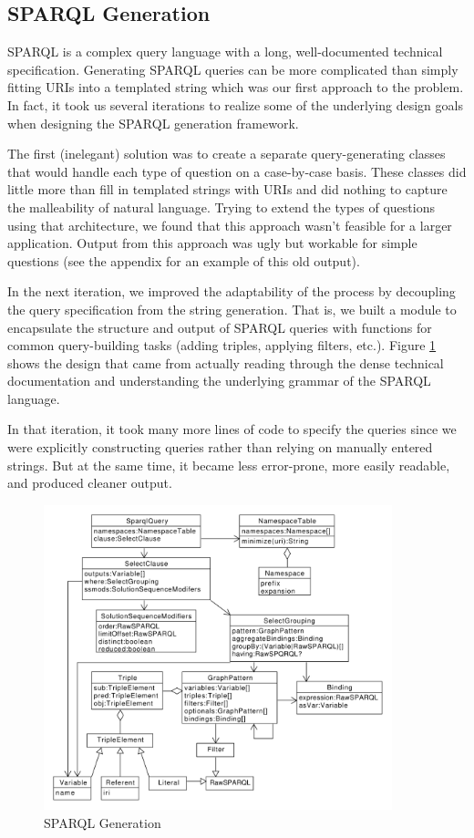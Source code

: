 \documentclass[11pt]{article}
\begin{document}
\subsection{SPARQL Generation}
\label{section:sparql_gen}
SPARQL is a complex query language with a long, well-documented 
technical specification\cite{sparql, sparql11}. Generating SPARQL queries can be
more complicated than simply fitting URIs into a templated string which was our
first approach to the problem. In fact, it took us several iterations to realize
some of the underlying design goals when designing the SPARQL generation framework.

The first (inelegant) solution was to create a separate query-generating
classes that would handle each type of question on a case-by-case basis.
These classes did little more than fill in templated strings with URIs and did
nothing to capture the malleability of natural language.
Trying to extend the types of questions using that architecture, we found that
this approach wasn't feasible for a larger application.
Output from this approach was ugly but workable for simple questions (see the
appendix for an example of this old output).

In the next iteration, we improved the adaptability of the process by 
decoupling the query specification from the string generation. 
That is, we built a module to encapsulate the structure and output of SPARQL
queries with functions for common query-building tasks (adding triples, 
applying filters, etc.). Figure \ref{fig:sparql_gen} shows the design that came from
actually reading through the dense technical documentation and understanding the
underlying grammar of the SPARQL language.

In that iteration, it took many more lines of code to specify the queries since
we were explicitly constructing queries rather than relying on manually
entered strings. But at the same time, it became less error-prone, more
easily readable, and produced cleaner output.

\begin{figure}[h!]
    \centering
    \includegraphics[width=0.9\textwidth,natwidth=1,natheight=1]{umlet/sparql.pdf}
    \caption{SPARQL Generation \cite{sparql, sparql11}}
    \label{fig:sparql_gen}
\end{figure}
\end{document}
